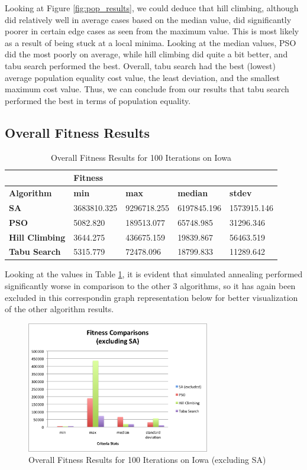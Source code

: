 \documentclass[journal]{IEEEtran}
\begin{document}
Looking at Figure \ref{fig:pop_results}, we could deduce that hill climbing, although did relatively well in average cases based on the median value, did significantly poorer in certain edge cases as seen from the maximum value. This is most likely as a result of being stuck at a local minima. Looking at the median values, PSO did the most poorly on average, while hill climbing did quite a bit better, and tabu search performed the best. Overall, tabu search had the best (lowest) average population equality cost value, the least deviation, and the smallest maximum cost value. Thus, we can conclude from our results that tabu search performed the best in terms of population equality.

\subsection{Overall Fitness Results}

\begin{table}[!h]
\centering
\caption{Overall Fitness Results for 100 Iterations on Iowa}
\label{tab:fitness_100iter}
\begin{tabular}{l|llll}
                       & \multicolumn{4}{l}{\textbf{Fitness}}                          \\ \hline
\textbf{Algorithm}     & \textbf{min} & \textbf{max} & \textbf{median} & \textbf{stdev} \\ \hline
\textbf{SA}            & 3683810.325  & 9296718.255  & 6197845.196     & 1573915.146    \\
\textbf{PSO}           & 5082.820     & 189513.077   & 65748.985       & 31296.346      \\
\textbf{Hill Climbing} & 3644.275     & 436675.159   & 19839.867       & 56463.519      \\
\textbf{Tabu Search}   & 5315.779     & 72478.096    & 18799.833       & 11289.642     
\end{tabular}
\end{table}

Looking at the values in Table \ref{tab:fitness_100iter}, it is evident that simulated annealing performed significantly worse in comparison to the other 3 algorithms, so it has again been excluded in this correspondin graph representation below for better visualization of the other algorithm results. 

\begin{figure}[h!]
    \includegraphics[width=8cm]{images/fitness_graph.png}
    \centering
    \caption{Overall Fitness Results for 100 Iterations on Iowa (excluding SA)}
    \label{fig:fitness_results}
\end{figure}
\end{document}
